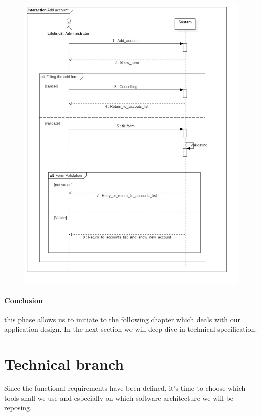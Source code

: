  \begin{figure}[H]
	\centering
	\includegraphics[height=0.7\textheight]{fig01/AddAccount}
	\label{fig:FilialesEtClients}
\end{figure}

\paragraph{Conclusion}
\label{sec:sec01}
this phase allows us to initiate to the following chapter which deals with our application design. In the next section
we will deep dive in technical specification.
\newpage
\section{Technical branch}
\label{subsec:subsec01}
Since the functional requirements have been defined, it's time to choose which tools shall we use and
 especially on which software architecture we will be reposing. 

